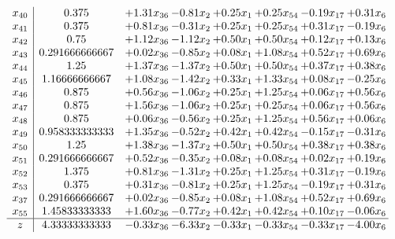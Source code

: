 \documentclass[8pt]{article}
\begin{document}
\[\begin{array}{c| c c@{\hskip 2pt} c@{\hskip 2pt} c@{\hskip 2pt} c@{\hskip 2pt} c@{\hskip 2pt} c@{\hskip 2pt} }
 x_{40}   &  0.375 & +  1.31 x_{36} & -0.81 x_{2} & +  0.25 x_{1} & +  0.25 x_{54} & -0.19 x_{17} & +  0.31 x_{6}\\
 x_{41}   &  0.375 & +  0.81 x_{36} & -0.31 x_{2} & +  0.25 x_{1} & +  0.25 x_{54} & +  0.31 x_{17} & -0.19 x_{6}\\
 x_{42}   &  0.75 & +  1.12 x_{36} & -1.12 x_{2} & +  0.50 x_{1} & +  0.50 x_{54} & +  0.12 x_{17} & +  0.13 x_{6}\\
 x_{43}   &  0.291666666667 & +  0.02 x_{36} & -0.85 x_{2} & +  0.08 x_{1} & +  1.08 x_{54} & +  0.52 x_{17} & +  0.69 x_{6}\\
 x_{44}   &  1.25 & +  1.37 x_{36} & -1.37 x_{2} & +  0.50 x_{1} & +  0.50 x_{54} & +  0.37 x_{17} & +  0.38 x_{6}\\
 x_{45}   &  1.16666666667 & +  1.08 x_{36} & -1.42 x_{2} & +  0.33 x_{1} & +  1.33 x_{54} & +  0.08 x_{17} & -0.25 x_{6}\\
 x_{46}   &  0.875 & +  0.56 x_{36} & -1.06 x_{2} & +  0.25 x_{1} & +  1.25 x_{54} & +  0.06 x_{17} & +  0.56 x_{6}\\
 x_{47}   &  0.875 & +  1.56 x_{36} & -1.06 x_{2} & +  0.25 x_{1} & +  0.25 x_{54} & +  0.06 x_{17} & +  0.56 x_{6}\\
 x_{48}   &  0.875 & +  0.06 x_{36} & -0.56 x_{2} & +  0.25 x_{1} & +  1.25 x_{54} & +  0.56 x_{17} & +  0.06 x_{6}\\
 x_{49}   &  0.958333333333 & +  1.35 x_{36} & -0.52 x_{2} & +  0.42 x_{1} & +  0.42 x_{54} & -0.15 x_{17} & -0.31 x_{6}\\
 x_{50}   &  1.25 & +  1.38 x_{36} & -1.37 x_{2} & +  0.50 x_{1} & +  0.50 x_{54} & +  0.38 x_{17} & +  0.38 x_{6}\\
 x_{51}   &  0.291666666667 & +  0.52 x_{36} & -0.35 x_{2} & +  0.08 x_{1} & +  0.08 x_{54} & +  0.02 x_{17} & +  0.19 x_{6}\\
 x_{52}   &  1.375 & +  0.81 x_{36} & -1.31 x_{2} & +  0.25 x_{1} & +  1.25 x_{54} & +  0.31 x_{17} & -0.19 x_{6}\\
 x_{53}   &  0.375 & +  0.31 x_{36} & -0.81 x_{2} & +  0.25 x_{1} & +  1.25 x_{54} & -0.19 x_{17} & +  0.31 x_{6}\\
 x_{37}   &  0.291666666667 & +  0.02 x_{36} & -0.85 x_{2} & +  0.08 x_{1} & +  1.08 x_{54} & +  0.52 x_{17} & +  0.69 x_{6}\\
 x_{55}   &  1.45833333333 & +  1.60 x_{36} & -0.77 x_{2} & +  0.42 x_{1} & +  0.42 x_{54} & +  0.10 x_{17} & -0.06 x_{6}\\
\hline
z    &  4.33333333333 & -0.33 x_{36} & -6.33 x_{2} & -0.33 x_{1} & -0.33 x_{54} & -0.33 x_{17} & -4.00 x_{6}\\
\end{array}\]
\end{document}
